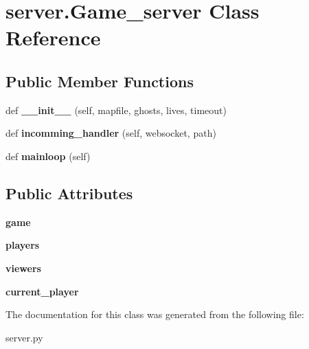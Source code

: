 \hypertarget{classserver_1_1_game__server}{}\section{server.\+Game\+\_\+server Class Reference}
\label{classserver_1_1_game__server}
\subsection*{Public Member Functions}
\begin{DoxyCompactItemize}
\item 
\mbox{\label{classserver_1_1_game__server_a294312be0cdb7e887a64d8281d44ddc3}} 
def {\bfseries \+\_\+\+\_\+init\+\_\+\+\_\+} (self, mapfile, ghosts, lives, timeout)
\item 
\mbox{\label{classserver_1_1_game__server_aada9e6ec4b0d5cdd1cc2a9ff08d6ccaa}} 
def {\bfseries incomming\+\_\+handler} (self, websocket, path)
\item 
\mbox{\label{classserver_1_1_game__server_a53f0cd8ebe3ab1cc23cf5e4eacc42bcb}} 
def {\bfseries mainloop} (self)
\end{DoxyCompactItemize}
\subsection*{Public Attributes}
\begin{DoxyCompactItemize}
\item 
\mbox{\label{classserver_1_1_game__server_a44d5a68391307745ab467e6590a7ffcd}} 
{\bfseries game}
\item 
\mbox{\label{classserver_1_1_game__server_a4ac67d1309fc37a51a3c7dcd7107281e}} 
{\bfseries players}
\item 
\mbox{\label{classserver_1_1_game__server_a161ee44e95c4fae01f01ed2eb8bd8a2e}} 
{\bfseries viewers}
\item 
\mbox{\label{classserver_1_1_game__server_a89a908343b7be38a6c5d38dcf4b0feca}} 
{\bfseries current\+\_\+player}
\end{DoxyCompactItemize}


The documentation for this class was generated from the following file\+:\begin{DoxyCompactItemize}
\item 
server.\+py\end{DoxyCompactItemize}
